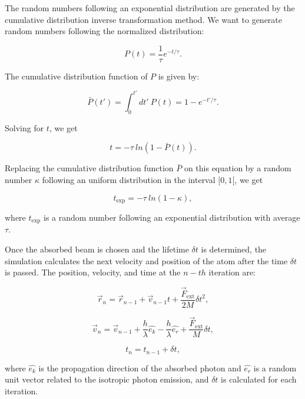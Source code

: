 \documentclass[12pt,a4paper,twoside]{article}
\begin{document}
The random numbers following an exponential distribution are generated by the cumulative distribution inverse transformation method.\cite{LucDevroye} We want to generate random numbers following the normalized distribution:

\begin{equation*}
	P(t) = \dfrac{1}{\tau} e^{-t/\tau}.
\end{equation*}

The cumulative distribution function of $P$ is given by:

\begin{equation*}
	\bar{P}(t') = \int_0^{t'} dt'\ P(t) = 1 - e^{-t'/\tau}.
\end{equation*}

Solving for $t$, we get

\begin{equation*}
	t = -\tau\ ln\left(1 - \bar{P}(t)\right).
\end{equation*}

Replacing the cumulative distribution function $\bar{P}$ on this equation by a random number $\kappa$ following an uniform distribution in the interval $[0,1[$, we get

\begin{equation}
	t_{\mathrm{exp}} = -\tau\ ln\left(1 - \kappa\right),
\end{equation}

\noindent
where $t_{\mathrm{exp}}$ is a random number following an exponential distribution with average $\tau$.

Once the absorbed beam is chosen and the lifetime $\delta t$ is determined, the simulation calculates the next velocity and position of the atom after the time $\delta t$ is passed. The position, velocity, and time at the $n-th$ iteration are:

\begin{equation}
	\vec{r}_n = \vec{r}_{n-1} +
	\vec{v}_{n-1}t + 
	\frac{\vec{F}_\mathrm{ext}}{2M}{\delta t}^2,
\end{equation}

\begin{equation}
	\vec{v}_n = \vec{v}_{n-1} +
	\frac{h}{\lambda}\hat{e_k} -
	\frac{h}{\lambda}\hat{e_r} +
	\frac{\vec{F}_\mathrm{ext}}{M}\delta t,
\end{equation}

\begin{equation}
	t_n = t_{n-1} + \delta t,
\end{equation}

\noindent
where $\hat{e_k}$ is the propagation direction of the absorbed photon and $\hat{e_r}$ is a random unit vector related to the isotropic photon emission, and $\delta t$ is calculated for each iteration.
\end{document}
